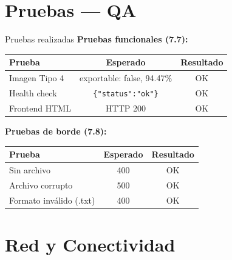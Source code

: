 \documentclass[aspectratio=169]{beamer}
\begin{document}
\section{Pruebas — QA}

\begin{frame}{Pruebas realizadas}
  \textbf{Pruebas funcionales (7.7):}

  \begin{tabular}{|l|c|c|}
    \hline
    \textbf{Prueba} & \textbf{Esperado} & \textbf{Resultado} \\
    \hline
    Imagen Tipo 4 & exportable: false, 94.47\% & \textcolor{verde}{OK} \\
    Health check & \texttt{\{"status":"ok"\}} & \textcolor{verde}{OK} \\
    Frontend HTML & HTTP 200 & \textcolor{verde}{OK} \\
    \hline
  \end{tabular}

  \vspace{1em}
  \textbf{Pruebas de borde (7.8):}

  \begin{tabular}{|l|c|c|}
    \hline
    \textbf{Prueba} & \textbf{Esperado} & \textbf{Resultado} \\
    \hline
    Sin archivo & 400 & \textcolor{verde}{OK} \\
    Archivo corrupto & 500 & \textcolor{verde}{OK} \\
    Formato inválido (.txt) & 400 & \textcolor{verde}{OK} \\
    \hline
  \end{tabular}
\end{frame}

\section{Red y Conectividad}
\end{document}
